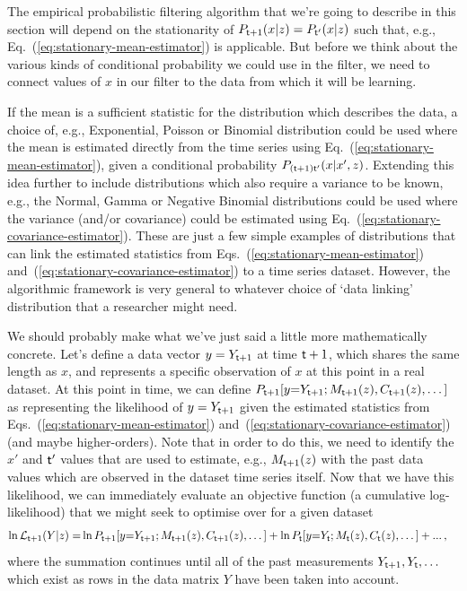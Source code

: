 The empirical probabilistic filtering algorithm that we're going to describe in this section will depend on the stationarity of $P_{{\sf t}+1}(x\vert z)=P_{{\sf t}'}(x\vert z)$ such that, e.g., Eq.~(\ref{eq:stationary-mean-estimator}) is applicable. But before we think about the various kinds of conditional probability we could use in the filter, we need to connect values of $x$ in our filter to the data from which it will be learning. 

If the mean is a sufficient statistic for the distribution which describes the data, a choice of, e.g., Exponential, Poisson or Binomial distribution could be used where the mean is estimated directly from the time series using Eq.~(\ref{eq:stationary-mean-estimator}), given a conditional probability $P_{({\sf t}+1){\sf t}'}(x\vert x',z)$. Extending this idea further to include distributions which also require a variance to be known, e.g., the Normal, Gamma or Negative Binomial distributions could be used where the variance (and/or covariance) could be estimated using Eq.~(\ref{eq:stationary-covariance-estimator}). These are just a few simple examples of distributions that can link the estimated statistics from Eqs.~(\ref{eq:stationary-mean-estimator}) and~(\ref{eq:stationary-covariance-estimator}) to a time series dataset. However, the algorithmic framework is very general to whatever choice of `data linking' distribution that a researcher might need.

We should probably make what we've just said a little more mathematically concrete. Let's define a data vector $y=Y_{{\sf t}+1}$ at time ${\sf t}+1$, which shares the same length as $x$, and represents a specific observation of $x$ at this point in a real dataset. At this point in time, we can define $P_{{\sf t}+1}[y{=}Y_{{\sf t}+1};M_{{\sf t}+1}(z),C_{{\sf t}+1}(z),\dots ]$ as representing the likelihood of $y=Y_{{\sf t}+1}$ given the estimated statistics from Eqs.~(\ref{eq:stationary-mean-estimator}) and~(\ref{eq:stationary-covariance-estimator}) (and maybe higher-orders). Note that in order to do this, we need to identify the $x'$ and ${\sf t}'$ values that are used to estimate, e.g., $M_{{\sf t}+1}(z)$ with the past data values which are observed in the dataset time series itself. Now that we have this likelihood, we can immediately evaluate an objective function (a cumulative log-likelihood) that we might seek to optimise over for a given dataset 
\begin{align}
\ln {\cal L}_{{\sf t}+1}(Y\vert z) = &\ln P_{{\sf t}+1}[y{=}Y_{{\sf t}+1};M_{{\sf t}+1}(z),C_{{\sf t}+1}(z),\dots ] + \ln P_{{\sf t}}[y{=}Y_{{\sf t}};M_{{\sf t}}(z),C_{{\sf t}}(z),\dots ] + ... \,, \label{eq:log-likelihood-filter}
\end{align}
where the summation continues until all of the past measurements $Y_{{\sf t}+1}, Y_{{\sf t}}, \dots$ which exist as rows in the data matrix $Y$ have been taken into account.

